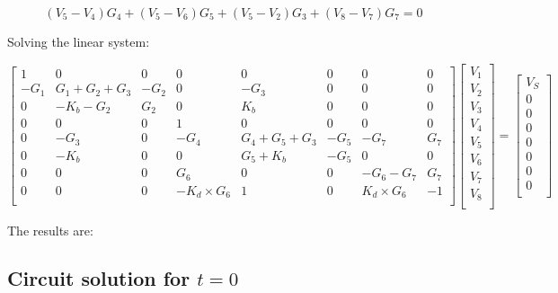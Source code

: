 \begin{equation}
  (V_5-V_4)G_4 + (V_5-V_6)G_5 + (V_5-V_2)G_3 + (V_8-V_7)G_7 = 0
  \label{eq:Node5}
\end{equation}

Solving the linear system:

$$
\begin{bmatrix}
1  &  0 & 0 & 0 & 0 & 0 & 0 & 0       \\
-G_1 & G_1+G_2+G_3 & -G_2 & 0 & -G_3 & 0 & 0 & 0      \\
0 & -K_b-G_2 & G_2 & 0 & K_b & 0 & 0 & 0\\
0 & 0 & 0  & 1 & 0 & 0 & 0 & 0      \\
0 & -G_3 & 0 & -G_4 & G_4+G_5+G_3 & -G_5 & -G_7 & G_7\\
0 & -K_b & 0 & 0 & G_5+K_b & -G_5 & 0 & 0 \\
0 & 0& 0 & G_6 & 0 & 0 & -G_6-G_7 & G_7\\
0 & 0 & 0 & -K_d\times G_6 & 1 & 0 & K_d\times G_6 & -1\\
\end{bmatrix}
\begin{bmatrix}
V_1     \\
V_2    \\
V_3   \\
V_4     \\
V_5     \\
V_6     \\
V_7     \\
V_8     \\
\end{bmatrix}
=
\begin{bmatrix}
V_S   \\
0    \\
0  \\
0  \\
0  \\
0  \\
0  \\
0  \\
\end{bmatrix}
\quad
$$

The results are:



\newpage



\subsection{Circuit solution for $t=0$}

